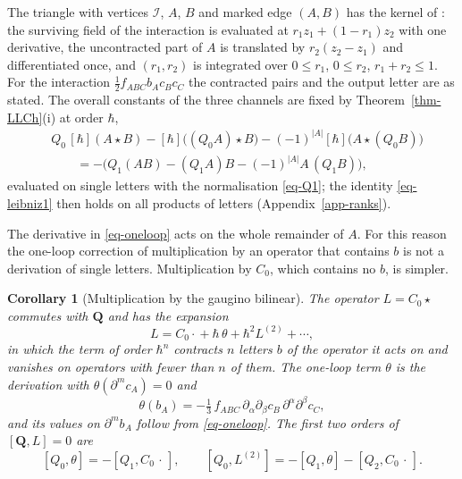 \documentclass[11pt]{article}
\numberwithin{equation}{section}
\numberwithin{figure}{section}
\numberwithin{table}{section}
\newtheorem{corollary}[theorem]{Corollary}
\theoremstyle{definition}
\newcommand{\Qp}{\mathbf Q}
\begin{document}
\begin{proofbox}
The triangle with vertices $\mathcal I$, $A$, $B$ and marked edge $(A,B)$ has the kernel of \cite[Equation~(6.28)]{LLCh}: the surviving field of the interaction is evaluated at $r_1z_1+(1-r_1)z_2$ with one derivative, the uncontracted part of $A$ is translated by $r_2(z_2-z_1)$ and differentiated once, and $(r_1,r_2)$ is integrated over $0\le r_1$, $0\le r_2$, $r_1+r_2\le1$. For the interaction $\tfrac12f_{ABC}b_Ac_Bc_C$ the contracted pairs and the output letter are as stated. The overall constants of the three channels are fixed by Theorem~\ref{thm-LLCh}(i) at order $\hbar$,
\begin{equation}\label{eq-leibniz1}
\begin{aligned}
&Q_0\,[\hbar](A\star B)-[\hbar]\big((Q_0A)\star B\big)-(-1)^{|A|}[\hbar]\big(A\star(Q_0B)\big)\\
&\qquad=-\Big(Q_1(AB)-(Q_1A)B-(-1)^{|A|}A\,(Q_1B)\Big),
\end{aligned}
\end{equation}
evaluated on single letters with the normalisation \eqref{eq-Q1}; the identity \eqref{eq-leibniz1} then holds on all products of letters (Appendix~\ref{app-ranks}).
\end{proofbox}

The derivative in \eqref{eq-oneloop} acts on the whole remainder of $A$. For this reason the one-loop correction of multiplication by an operator that contains $b$ is not a derivation of single letters. Multiplication by $C_0$, which contains no $b$, is simpler.

\begin{corollary}[Multiplication by the gaugino bilinear]\label{cor-L}
The operator $L=C_0\star{}$ commutes with $\Qp$ and has the expansion
\begin{equation}\label{eq-L}
L=C_0\cdot{}+\hbar\,\theta+\hbar^2L^{(2)}+\cdots,
\end{equation}
in which the term of order $\hbar^n$ contracts $n$ letters $b$ of the operator it acts on and vanishes on operators with fewer than $n$ of them. The one-loop term $\theta$ is the derivation with $\theta(\partial^mc_A)=0$ and
\begin{equation}\label{eq-theta}
\theta(b_A)=-\tfrac13\,f_{ABC}\,\partial_\alpha\partial_\beta c_B\,\partial^\alpha\partial^\beta c_C ,
\end{equation}
and its values on $\partial^mb_A$ follow from \eqref{eq-oneloop}. The first two orders of $[\Qp,L]=0$ are
\begin{equation}\label{eq-L-eqs}
[Q_0,\theta]=-[Q_1,C_0\,\cdot\,],\qquad [Q_0,L^{(2)}]=-[Q_1,\theta]-[Q_2,C_0\,\cdot\,].
\end{equation}
\end{corollary}
\end{document}
